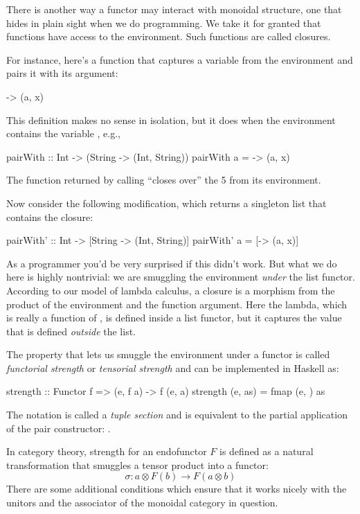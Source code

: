 \documentclass[DaoFP]{subfiles}
\begin{document}
There is another way a functor may interact with monoidal structure, one that hides in plain sight when we do programming. We take it for granted that functions have access to the environment. Such functions are called closures.

For instance, here's a function that captures a variable  from the environment and pairs it with its argument:
\begin{haskell}
\x -> (a, x)
\end{haskell}
This definition makes no sense in isolation, but it does when the environment contains the variable , e.g.,
\begin{haskell}
pairWith :: Int -> (String -> (Int, String))
pairWith a = \x -> (a, x)
\end{haskell}
The function returned by calling  ``closes over'' the 5 from its environment.

Now consider the following modification, which returns a singleton list that contains the closure:
\begin{haskell}
pairWith' :: Int -> [String -> (Int, String)]
pairWith' a = [\x -> (a, x)]
\end{haskell}
As a programmer you'd be very surprised if this didn't work. But what we do here is highly nontrivial: we are smuggling the environment \emph{under} the list functor. According to our model of lambda calculus, a closure is a morphism from the product of the environment and the function argument. Here the lambda, which is really a function of , is defined inside a list functor, but it captures the value  that is defined \emph{outside} the list.

The property that lets us smuggle the environment under a functor is called \emph{functorial strength} or \emph{tensorial strength} and can be implemented in Haskell as:
\begin{haskell}
strength :: Functor f => (e, f a) -> f (e, a)
strength (e, as) = fmap (e, ) as
\end{haskell}
The notation  is called a \emph{tuple section} and is equivalent to the partial application of the pair constructor: .

In category theory, strength for an endofunctor $F$ is defined as a natural transformation that smuggles a tensor product into a functor:
\[ \sigma \colon a \otimes F(b) \to F (a \otimes b) \]
There are some additional conditions which ensure that it works nicely with the unitors and the associator of the monoidal category in question.
\end{document}
